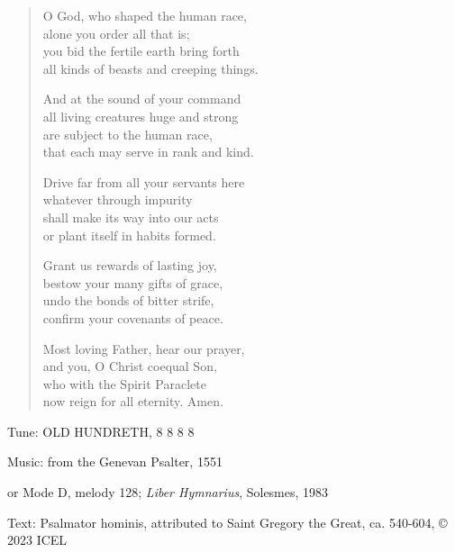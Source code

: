 \hymn

\begin{verse}
O God, who shaped the human race,\\
alone you order all that is;\\
you bid the fertile earth bring forth\\
all kinds of beasts and creeping things.

And at the sound of your command\\
all living creatures huge and strong\\
are subject to the human race,\\
that each may serve in rank and kind.

Drive far from all your servants here\\
whatever through impurity\\
shall make its way into our acts\\
or plant itself in habits formed.

Grant us rewards of lasting joy,\\
bestow your many gifts of grace,\\
undo the bonds of bitter strife,\\
confirm your covenants of peace.

Most loving Father, hear our prayer,\\
and you, O Christ coequal Son,\\
who with the Spirit Paraclete\\
now reign for all eternity. Amen.
\end{verse}

\begin{hymnsource}
Tune: OLD HUNDRETH, 8 8 8 8

Music: from the Genevan Psalter, 1551

or Mode D, melody 128; \emph{Liber Hymnarius}, Solesmes, 1983

Text: Psalmator hominis, attributed to Saint Gregory the Great, ca. 540-604, © 2023 ICEL
\end{hymnsource}